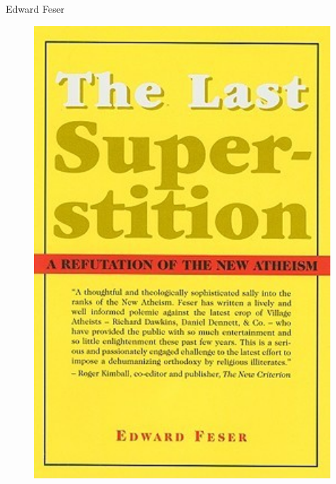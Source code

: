 \documentclass[xcolor=dvipsnames]{beamer}
\begin{document}
\begin{frame}{Edward Feser}
\begin{figure}
  \centering
  \begin{columns}
    \centering
    \includegraphics[width=0.99\textwidth]{superstition}
    \centering

\end{columns}
\end{figure}
\end{frame}
\end{document}

